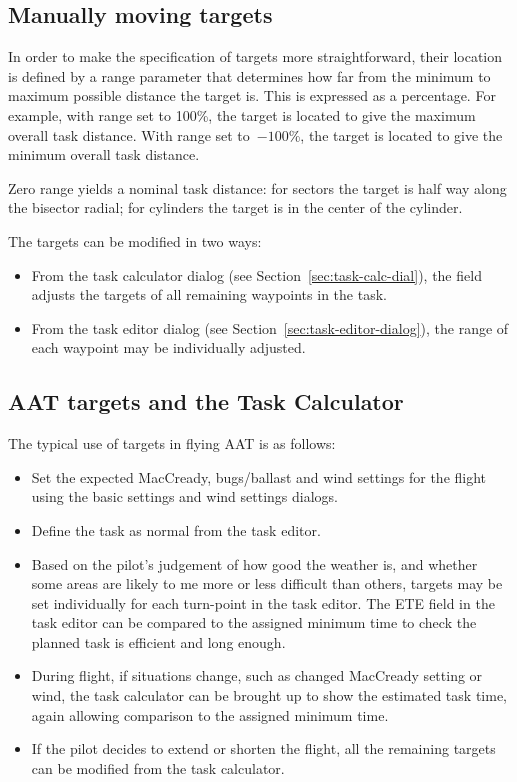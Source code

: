 \documentclass[a4paper,12pt]{refrep}
\begin{document}
\subsection*{Manually moving targets}

In order to make the specification of targets more straightforward,
their location is defined by a range parameter that determines how
far from the minimum to maximum possible distance the target is.  This
is expressed as a percentage.  For example, with range set to 100\%,
the target is located to give the maximum overall task distance.  With
range set to~$-100$\%, the target is located to give the minimum overall
task distance.  

Zero range yields a nominal task distance: for sectors the target is
half way along the bisector radial; for cylinders the target is in the
center of the cylinder.

The targets can be modified in two ways:
\begin{itemize}
\item From the task calculator dialog (see 
 Section~\ref{sec:task-calc-dial}), the  field adjusts the
 targets of all remaining waypoints in the task.
\item From the task editor dialog (see 
 Section~\ref{sec:task-editor-dialog}), the range of each waypoint may
 be individually adjusted.
\end{itemize}

\subsection*{AAT targets and the Task Calculator}

The typical use of targets in flying AAT is as follows:
\begin{itemize}
\item Set the expected MacCready, bugs/ballast and wind settings
  for the flight using the basic settings and wind settings dialogs.
\item Define the task as normal from the task editor.
\item Based on the pilot's judgement of how good the weather is,
  and whether some areas are likely to me more or less difficult than
  others, targets may be set individually for each turn-point in the
  task editor.  The ETE field in the task editor can be compared to
  the assigned minimum time to check the planned task is efficient and
  long enough.
\item During flight, if situations change, such as changed MacCready setting
  or wind, the task calculator can be brought up to show the estimated
  task time, again allowing comparison to the assigned minimum time.
\item If the pilot decides to extend or shorten the flight, all the remaining
  targets can be modified from the task calculator. 
\end{itemize}
\end{document}
